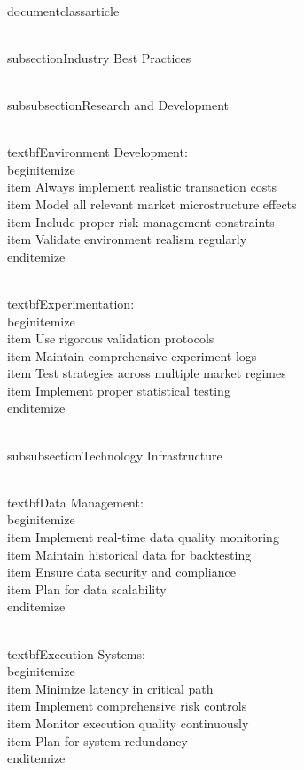 \\documentclass{article}
\begin{document}
\\subsection{Industry Best Practices}

\\subsubsection{Research and Development}

\\textbf{Environment Development}:
\\begin{itemize}
\\item Always implement realistic transaction costs
\\item Model all relevant market microstructure effects
\\item Include proper risk management constraints
\\item Validate environment realism regularly
\\end{itemize}

\\textbf{Experimentation}:
\\begin{itemize}
\\item Use rigorous validation protocols
\\item Maintain comprehensive experiment logs
\\item Test strategies across multiple market regimes
\\item Implement proper statistical testing
\\end{itemize}

\\subsubsection{Technology Infrastructure}

\\textbf{Data Management}:
\\begin{itemize}
\\item Implement real-time data quality monitoring
\\item Maintain historical data for backtesting
\\item Ensure data security and compliance
\\item Plan for data scalability
\\end{itemize}

\\textbf{Execution Systems}:
\\begin{itemize}
\\item Minimize latency in critical path
\\item Implement comprehensive risk controls
\\item Monitor execution quality continuously
\\item Plan for system redundancy
\\end{itemize}
\end{document}
